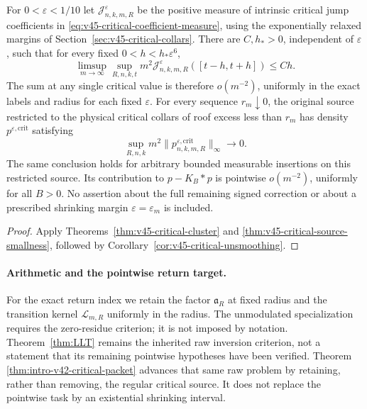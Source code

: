 \begin{leadtheorem}
\label{thm:intro-v45-critical-cluster}
For $0<\varepsilon<1/10$ let $\mathcal J^\varepsilon_{n,k,m,R}$ be the
positive measure of intrinsic critical jump coefficients in
\eqref{eq:v45-critical-coefficient-measure}, using the exponentially
relaxed margins of Section~\ref{sec:v45-critical-collars}. There are
$C,h_*>0$, independent of $\varepsilon$, such that for every fixed
$0<h<h_*\varepsilon^6$,
\[
 \limsup_{m\to\infty}\sup_{R,n,k,t}
       m^2\mathcal J^\varepsilon_{n,k,m,R}([t-h,t+h])\le Ch.
\]
The sum at any single critical value is therefore $o(m^{-2})$,
uniformly in the exact labels and radius for each fixed $\varepsilon$.
For every sequence $r_m\downarrow0$, the original source restricted
to the physical critical collars of roof excess less than $r_m$ has
density $p^{\varepsilon,\mathrm{crit}}$ satisfying
\[
 \sup_{R,n,k}m^2\|p^{\varepsilon,\mathrm{crit}}_{n,k,m,R}\|_\infty
       \longrightarrow0.
\]
The same conclusion holds for arbitrary bounded measurable insertions
on this restricted source. Its contribution to $p-K_B*p$ is pointwise
$o(m^{-2})$, uniformly for all $B>0$. No assertion about the full
remaining signed correction or about a prescribed shrinking margin
$\varepsilon=\varepsilon_m$ is included.
\end{leadtheorem}
\begin{proof}
Apply Theorems~\ref{thm:v45-critical-cluster} and
\ref{thm:v45-critical-source-smallness}, followed by
Corollary~\ref{cor:v45-critical-unsmoothing}.
\end{proof}

\paragraph{Arithmetic and the pointwise return target.}
For the exact return index we retain the factor $\mathfrak a_R$ at
fixed radius and the transition kernel $\mathcal L_{m,R}$ uniformly
in the radius. The unmodulated specialization requires the zero-residue
criterion; it is not imposed by notation. Theorem~\ref{thm:LLT}
remains the inherited raw inversion criterion, not a statement that
its remaining pointwise hypotheses have been verified. Theorem~
\ref{thm:intro-v42-critical-packet} advances that same raw problem by
retaining, rather than removing, the regular critical source. It does
not replace the pointwise task by an existential shrinking interval.


